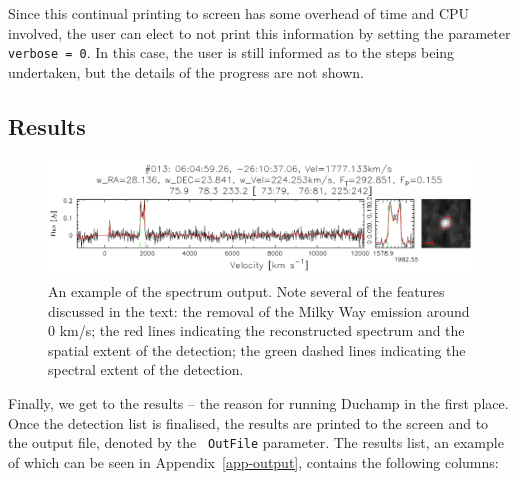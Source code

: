 \documentclass[12pt]{article}
\begin{document}
Since this continual printing to screen has some overhead of time and
CPU involved, the user can elect to not print this information by
setting the parameter {\tt verbose = 0}. In this case, the user is
still informed as to the steps being undertaken, but the details of
the progress are not shown.

\subsection{Results}

\begin{figure}[t]
\begin{center}
\includegraphics[width=\textwidth]{example_spectrum}
\end{center}
\caption{An example of the spectrum output. Note several of the
  features discussed in the text: the removal of the Milky Way
  emission around 0 km/s; the red lines indicating the reconstructed
  spectrum and the spatial extent of the detection; the green dashed
  lines indicating the spectral extent of the detection.}
\label{fig-spect}
\end{figure}

Finally, we get to the results -- the reason for running Duchamp in
the first place. Once the detection list is finalised, the results are
printed to the screen and to the output file, denoted by the {\tt
OutFile} parameter. The results list, an example of which can be seen
in Appendix~\ref{app-output}, contains the following columns:
\end{document}

